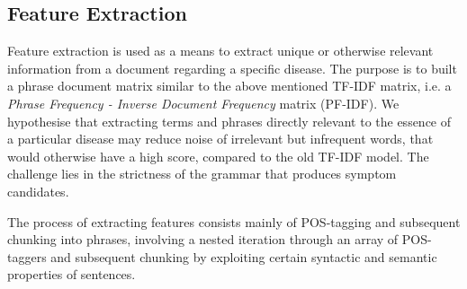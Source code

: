 \documentclass[10pt,letterpaper,final]{article}
\begin{document}



\subsection{Feature Extraction}
Feature extraction is used as a means to extract unique or otherwise
relevant information from a document regarding a specific disease. The
purpose is to built a phrase document matrix similar to the above
mentioned TF-IDF matrix, i.e. a \textit{Phrase Frequency - Inverse
Document Frequency} matrix (PF-IDF). We hypothesise that extracting
terms and phrases directly relevant to the essence of a particular
disease may reduce noise of irrelevant but infrequent words, that would
otherwise have a high score, compared to the old TF-IDF model. The
challenge lies in the strictness of the grammar that produces symptom
candidates.

The process of extracting features consists mainly of POS-tagging and
subsequent chunking into phrases, involving a nested iteration through
an array of POS-taggers and subsequent chunking by exploiting certain
syntactic and semantic properties of sentences.
\end{document}
